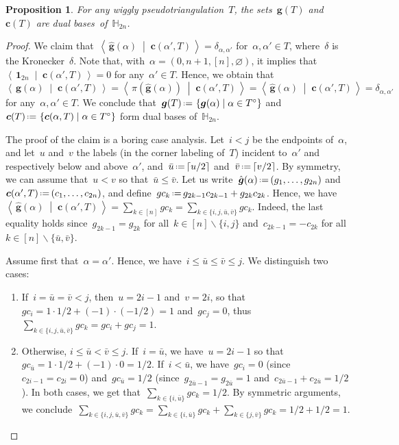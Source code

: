 \documentclass{amsart}
\newtheorem{proposition}[theorem]{Proposition}
\theoremstyle{definition}
\newcommand{\HH}{\mathbb{H}} %
\renewcommand{\b}[1]{{\boldsymbol{#1}}} %
\newcommand{\set}[2]{\left\{ #1 \;\middle|\; #2 \right\}} %
\newcommand{\ssm}{\smallsetminus} %
\newcommand{\dotprod}[2]{\left\langle \, #1 \; \middle| \; #2 \, \right\rangle} %
\newcommand{\one}{\b{1}} %
\newcommand{\eqdef}{\mbox{\,\raisebox{0.2ex}{\scriptsize\ensuremath{\mathrm:}}\ensuremath{=}\,}} %
\begin{document}
\begin{proposition}
\label{prop:dualBases}
For any wiggly pseudotriangulation~$T$, the sets~$\b{g}(T)$ and~$\b{c}(T)$ are dual bases~of~$\HH_{2n}$.
\end{proposition}

\begin{proof}
We claim that~$\dotprod{\hat{\b{g}}(\alpha)}{\b{c}(\alpha', T)} = \delta_{\alpha, \alpha'}$ for~$\alpha, \alpha' \in T$, where~$\delta$ is the Kronecker~$\delta$.
Note that, with~$\alpha = (0, n+1, [n], \varnothing)$, it implies that~$\dotprod{\one_{2n}}{\b{c}(\alpha', T)} = 0$ for any~${\alpha' \in T}$.
Hence, we obtain that~$\dotprod{\b{g}(\alpha)}{\b{c}(\alpha', T)} = \dotprod{\pi(\hat{\b{g}}(\alpha))}{\b{c}(\alpha', T)} = \dotprod{\hat{\b{g}}(\alpha)}{\b{c}(\alpha', T)} = \delta_{\alpha, \alpha'}$ for any~$\alpha, \alpha' \in T$.
We conclude that~$\b{g}(T) \eqdef \set{\b{g}(\alpha)}{\alpha \in T^\circ}$ and~$\b{c}(T) \eqdef \set{\b{c}(\alpha, T)}{\alpha \in T^\circ}$ form dual bases of~$\HH_{2n}$.

The proof of the claim is a boring case analysis.
Let~$i < j$ be the endpoints of~$\alpha$, and let~$u$ and~$v$ the labels (in the corner labeling of~$T$) incident to~$\alpha'$ and respectively below and above~$\alpha'$, and~$\bar u \eqdef \lceil u/2 \rceil$ and~$\bar v \eqdef \lceil v/2 \rceil$.
By symmetry, we can assume that~$u < v$ so that~$\bar u \le \bar v$.
Let us write~$\hat{\b{g}}(\alpha) \eqdef (g_1, \dots, g_{2n})$ and~$\b{c}(\alpha', T) \eqdef (c_1, \dots, c_{2n})$, and define~$gc_k \eqdef g_{2k-1}c_{2k-1} + g_{2k}c_{2k}$.
Hence, we have~$\dotprod{\hat{\b{g}}(\alpha)}{\b{c}(\alpha', T)} = \sum_{k \in [n]} gc_k = \sum_{k \in \{i, j, \bar u, \bar v\}} gc_k$.
Indeed, the last equality holds since~$g_{2k-1} = g_{2k}$ for all~$k \in [n] \ssm \{i,j\}$ and~$c_{2k-1} = -c_{2k}$ for all~$k \in [n] \ssm \{\bar u, \bar v\}$.

Assume first that~$\alpha = \alpha'$.
Hence, we have~$i \le \bar u \le \bar v \le j$.
We distinguish two cases:
\begin{enumerate}
\item If~$i = \bar u = \bar v < j$, then~$u = 2i-1$ and~$v = 2i$, so that~$gc_i = 1 \cdot 1/2 + (-1) \cdot (-1/2) = 1$ and~$gc_j = 0$, thus~$\sum_{k \in \{i, j, \bar u, \bar v\}} gc_k = gc_i + gc_j = 1$.
\item Otherwise, $i \le \bar u < \bar v \le j$.
If~$i = \bar u$, we have~$u = 2i-1$ so that~$gc_{\bar u} = 1 \cdot 1/2 + (-1) \cdot 0 = 1/2$.
If~$i < \bar u$, we have~$gc_i = 0$ (since~$c_{2i-1} = c_{2i} = 0$) and~$gc_{\bar u} = 1/2$ (since~$g_{2\bar u-1} = g_{2\bar u} = 1$ and~${c_{2\bar u-1} + c_{2\bar u} = 1/2}$).
In both cases, we get that~$\sum_{k \in \{i, \bar u\}} gc_k = 1/2$.
By symmetric arguments, we conclude~${\sum_{k \in \{i, j, \bar u, \bar v\}} gc_k = \sum_{k \in \{i, \bar u\}} gc_k + \sum_{k \in \{j, \bar v\}} gc_k = 1/2 + 1/2 = 1}$.
\end{enumerate}


\end{proof}
\end{document}
